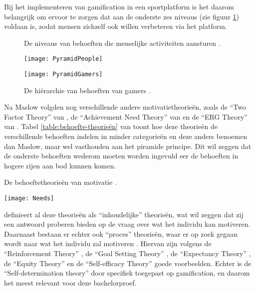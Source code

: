 Bij het implementeren van gamification in een sportplatform is het daarom belangrijk om ervoor te zorgen dat aan de onderste zes niveaus (zie figuur \ref{fig:gamers-hierarchy}) voldaan is, zodat mensen zichzelf ook willen verbeteren via het platform.

\begin{figure}[htbp]
    \begin{minipage}[t]{0.48\linewidth} %
        \centering
        \caption[Behoeften-hiërarchie algemeen]{De  niveaus van behoeften die menselijke activiteiten aansturen \autocite{Lilienfeld2014}.}
        \texttt{[image: PyramidPeople]}
        \label{fig:people-hierarchy}
    \end{minipage}
    \hfill
    \begin{minipage}[t]{0.48\linewidth} %
        \centering
        \caption[Behoeften-hiërarchie gamers]{De hiërarchie van behoeften van gamers \autocite{Richter2014}.}
        \texttt{[image: PyramidGamers]}
        \label{fig:gamers-hierarchy}
    \end{minipage}
\end{figure}

Na Maslow volgden nog verschillende andere motivatietheorieën, zoals de “Two Factor Theory” van \textcite{Herzberg1959}, de “Achievement Need Theory” van \textcite{McClelland1961} en de “ERG Theory” van \textcite{Alderfer1969}. Tabel \ref{table:behoefte-theorieën} van \textcite{Benke2019} toont hoe deze theorieën de verschillende behoeften indelen in minder categorieën en deze anders benoemen dan Maslow, maar wel vasthouden aan het piramide principe. Dit wil zeggen dat de onderste behoeften wederom moeten worden ingevuld eer de behoeften in hogere rijen aan bod kunnen komen.

\begin{table}[h]
    \caption[De behoeftetheorieën van motivatie]{De behoeftetheorieën van motivatie \autocite{Benke2019}.}
    \texttt{[image: Needs]}
    \label{table:behoefte-theorieën}
\end{table}


\textcite{KispalVitai2016} definieert al deze theorieën als “inhoudelijke” theorieën, wat wil zeggen dat zij een antwoord proberen bieden op de vraag over wat het individu kan motiveren. Daarnaast bestaan er echter ook “proces” theorieën, waar er op zoek gegaan wordt naar wat het individu zal motiveren \autocite{Robbins2011}. Hiervan zijn volgens \textcite{Benke2019} de “Reinforcement Theory” \autocite{Skinner1961}, de “Goal Setting Theory” \autocite{Locke1968}, de “Expectancy Theory” \autocite{Vroom1964}, de “Equity Theory” \autocite{Adams1963} en de “Self-efficacy Theory” \autocite{Bandura1973} goede voorbeelden. Echter is de “Self-determination theory” \autocite{Deci1985} door \textcite{Kam2018} specifiek toegepast op gamification, en daarom het meest relevant voor deze bachelorproef.

